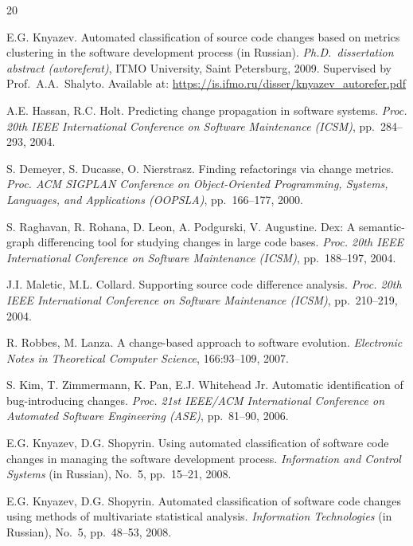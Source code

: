 \documentclass[11pt,a4paper]{article}
\begin{document}
\begin{thebibliography}{20}

E.G. Knyazev.
Automated classification of source code changes based on metrics clustering in the software development process (in Russian).
\textit{Ph.D.\ dissertation abstract (avtoreferat)}, ITMO University, Saint Petersburg, 2009.
Supervised by Prof.\ A.A.\ Shalyto.
Available at: \url{https://is.ifmo.ru/disser/knyazev_autorefer.pdf}

A.E. Hassan, R.C. Holt.
Predicting change propagation in software systems.
\textit{Proc. 20th IEEE International Conference on Software Maintenance (ICSM)}, pp.~284--293, 2004.

S. Demeyer, S. Ducasse, O. Nierstrasz.
Finding refactorings via change metrics.
\textit{Proc. ACM SIGPLAN Conference on Object-Oriented Programming, Systems, Languages, and Applications (OOPSLA)}, pp.~166--177, 2000.

S. Raghavan, R. Rohana, D. Leon, A. Podgurski, V. Augustine.
Dex: A semantic-graph differencing tool for studying changes in large code bases.
\textit{Proc. 20th IEEE International Conference on Software Maintenance (ICSM)}, pp.~188--197, 2004.

J.I. Maletic, M.L. Collard.
Supporting source code difference analysis.
\textit{Proc. 20th IEEE International Conference on Software Maintenance (ICSM)}, pp.~210--219, 2004.

R. Robbes, M. Lanza.
A change-based approach to software evolution.
\textit{Electronic Notes in Theoretical Computer Science}, 166:93--109, 2007.

S. Kim, T. Zimmermann, K. Pan, E.J. Whitehead Jr.
Automatic identification of bug-introducing changes.
\textit{Proc. 21st IEEE/ACM International Conference on Automated Software Engineering (ASE)}, pp.~81--90, 2006.

E.G. Knyazev, D.G. Shopyrin.
Using automated classification of software code changes in managing the software development process.
\textit{Information and Control Systems} (in Russian), No.~5, pp.~15--21, 2008.

E.G. Knyazev, D.G. Shopyrin.
Automated classification of software code changes using methods of multivariate statistical analysis.
\textit{Information Technologies} (in Russian), No.~5, pp.~48--53, 2008.


\end{thebibliography}
\end{document}
